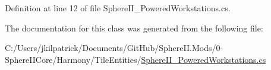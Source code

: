 Definition at line 12 of file Sphere\+I\+I\+\_\+\+Powered\+Workstations.\+cs.



The documentation for this class was generated from the following file\+:\begin{DoxyCompactItemize}
\item 
C\+:/\+Users/jkilpatrick/\+Documents/\+Git\+Hub/\+Sphere\+I\+I.\+Mods/0-\/\+Sphere\+I\+I\+Core/\+Harmony/\+Tile\+Entities/\mbox{\hyperlink{_sphere_i_i___powered_workstations_8cs}{Sphere\+I\+I\+\_\+\+Powered\+Workstations.\+cs}}\end{DoxyCompactItemize}
